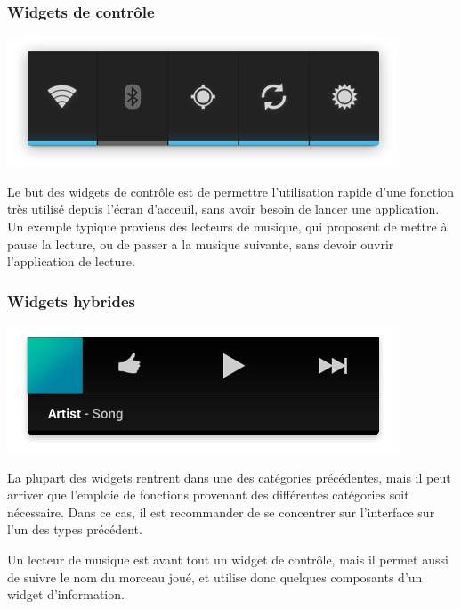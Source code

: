 \documentclass{beamer}
\begin{document}
\begin{frame}
\frametitle{Widgets de contrôle}
\begin{center}
\includegraphics[scale=0.4]{widgets_control.png}
\end{center}

Le but des widgets de contrôle est de permettre l'utilisation rapide d'une fonction très utilisé depuis l'écran d'acceuil, sans avoir besoin de lancer une application. Un exemple typique proviens des lecteurs de musique, qui proposent de mettre à pause la lecture, ou de passer a la musique suivante, sans devoir ouvrir l'application de lecture.
\end{frame}

\begin{frame}
\frametitle{Widgets hybrides}
\begin{center}
\includegraphics[scale=0.3]{widgets_hybrid.png}
\end{center}

La plupart des widgets rentrent dans une des catégories précédentes, mais il peut arriver que l’emploie de fonctions provenant des différentes catégories soit nécessaire. Dans ce cas, il est recommander de se concentrer sur l'interface sur l'un des types précédent.

\begin{exampleblock}{Un lecteur de musique}
est avant tout un widget de contrôle, mais il permet aussi de suivre le nom du morceau joué, et utilise donc quelques composants d'un widget d'information.
\end{exampleblock}
\end{frame}
\end{document}
